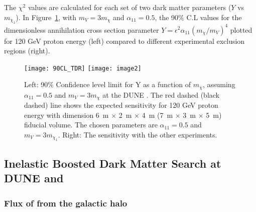 The $\chi^{2}$ values are calculated for each set of two dark matter parameters ($Y$ vs $m_{\chi_1}$).
In Figure~\ref{fig:chisq}, with $m_{V} = 3m_{\chi}$ and $\alpha_{11}=0.5$,  the 90$\%$ C.L  values for the dimensionless  annihilation
cross section parameter $Y = \epsilon^{2}\alpha_{11} (m_{\chi}/m_{V})^4$ plotted for 120 GeV proton energy (left) compared to different experimental exclusion regions (right).
 \begin{figure}[t]
 \centering
 \texttt{[image: 90CL\_TDR]}
 \texttt{[image: image2]}
 \caption[90$\%$ Confidence level limit for Y as a function of $m_{\chi}$ at ND]{\label{fig:chisq} Left: 90$\%$ Confidence level limit for Y as a function of $m_{\chi}$, assuming $\alpha_{11}=0.5$ and $m_{V} = 3m_{\chi}$ at the DUNE . 
The red dashed (black dashed) line shows the expected sensitivity for 120 GeV proton energy with  dimension  \SI{6}{m} $\times$ \SI{2}{m} $\times$ \SI{4}{m}  (\SI{7}{m} $\times$ \SI{3}{m} $\times$ \SI{5}{m}) fiducial volume. 
The chosen parameters are $\alpha_{11}=0.5$ and $m_{V}= 3m_{\chi_1}$.
Right: The sensitivity with the other experiments.}
 \end{figure}

\subsection{Inelastic Boosted Dark Matter Search at DUNE  and  \label{sec:FD}}

\subsubsection{Flux of  from the galactic halo \label{sec:flux}}

